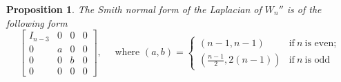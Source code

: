 \documentclass[11pt,reqno]{amsart}
\newcommand{\youngsu}[1]{{\textcolor{blue}{Youngsu: #1}}}
\theoremstyle{definition}
\theoremstyle{plain}
\newtheorem{proposition}[mydef]{Proposition}
\begin{document}

\begin{proposition}\label{proposition: wheel2}
The Smith normal form of the Laplacian of $W_n''$ is of the following form 
\begin{equation*}
\left[
\begin{array}{c|ccc}	
I_{n-3} & 0 & 0 & 0 \\
\hline
0 & a & 0 & 0 \\
0 & 0 & b & 0 \\
0 & 0 & 0 & 0 
\end{array}
\right], \quad \textrm{ where } (a,b) = \begin{cases}
(n-1,n-1) & \text{if}~ n ~\text{is even}; \\
(\frac{n-1}2, 2(n-1)) & \text{if}~ n ~\text{is odd}
\end{cases}
\end{equation*}
\end{proposition}
\end{document}
